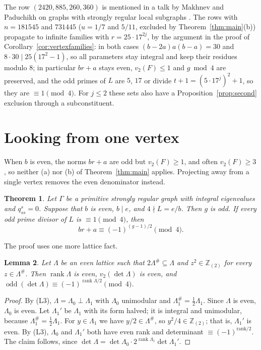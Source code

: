 \documentclass[11pt]{article}
\newtheorem{theorem}{Theorem}[section]
\newtheorem{lemma}[theorem]{Lemma}
\theoremstyle{definition}
\theoremstyle{remark}
\newcommand{\Z}{\mathbb Z}
\newcommand{\Zt}{\Z_{(2)}}
\newcommand{\odd}{\operatorname{odd}}
\begin{document}
The row $(2420,885,260,360)$ is mentioned in a talk by Makhnev and Paduchikh
on graphs with strongly regular local subgraphs \cite{MP}. The rows with
$n=181545$ and $731445$ ($u=1/7$ and $5/11$, excluded by
Theorem~\ref{thm:main}(b)) propagate to infinite families with
$r=25\cdot17^{2j}$, by the argument in the proof of
Corollary~\ref{cor:vertexfamilies}: in both cases $(b-2a)a(b-a)=30$ and
$8\cdot30\mid25(17^2-1)$, so all parameters stay integral and keep their
residues modulo $8$; in particular $br+a$ stays even, $v_2(F)\le1$ and
$g\bmod4$ are preserved, and the odd primes of $L$ are $5$, $17$ or divide
$t+1=(5\cdot17^j)^2+1$, so they are $\equiv1\pmod4$. For $j\le2$ these sets
also have a Proposition~\ref{prop:second} exclusion through a
subconstituent.

\section{Looking from one vertex}\label{sec:vertex}

When $b$ is even, the norms $br+a$ are odd but $v_2(F)\ge1$, and often
$v_2(F)\ge3$, so neither (a) nor (b) of Theorem~\ref{thm:main} applies. Projecting away from a
single vertex removes the even denominator instead.

\begin{theorem}\label{thm:vertex}
Let $\Gamma$ be a primitive strongly regular graph with integral eigenvalues
and $q^s_{ss}=0$. Suppose that $b$ is even, $b\mid e$, and $4\nmid L=e/b$. Then
$g$ is odd. If every odd prime divisor of $L$ is $\equiv1\pmod 4$, then
\[
 br+a\equiv(-1)^{(g-1)/2}\pmod 4 .
\]
\end{theorem}

The proof uses one more lattice fact.

\begin{lemma}\label{lem:even}
Let $\Lambda$ be an even lattice such that $2\Lambda^\#\subseteq \Lambda$ and $z^2\in\Zt$ for every
$z\in \Lambda^\#$. Then $\operatorname{rank}\Lambda$ is even, $v_2(\det \Lambda)$ is even, and
$\odd(\det \Lambda)\equiv(-1)^{\operatorname{rank}\Lambda/2}\pmod 4$.
\end{lemma}

\begin{proof}
By (L3), $\Lambda=\Lambda_0\perp \Lambda_1$ with $\Lambda_0$ unimodular and $\Lambda_1^\#=\frac12\Lambda_1$. Since
$\Lambda$ is even, $\Lambda_0$ is even. Let $\Lambda_1'$ be $\Lambda_1$ with its form halved; it is
integral and unimodular, because $\Lambda_1^\#=\tfrac12\Lambda_1$. For $y\in \Lambda_1$ we have
$y/2\in \Lambda^\#$, so $y^2/4\in\Zt$; that is, $\Lambda_1'$ is even. By (L3), $\Lambda_0$ and
$\Lambda_1'$ both have even rank and determinant $\equiv(-1)^{\mathrm{rank}/2}$. The
claim follows, since $\det \Lambda=\det \Lambda_0\cdot2^{\operatorname{rank}\Lambda_1}\det \Lambda_1'$.
\end{proof}
\end{document}
